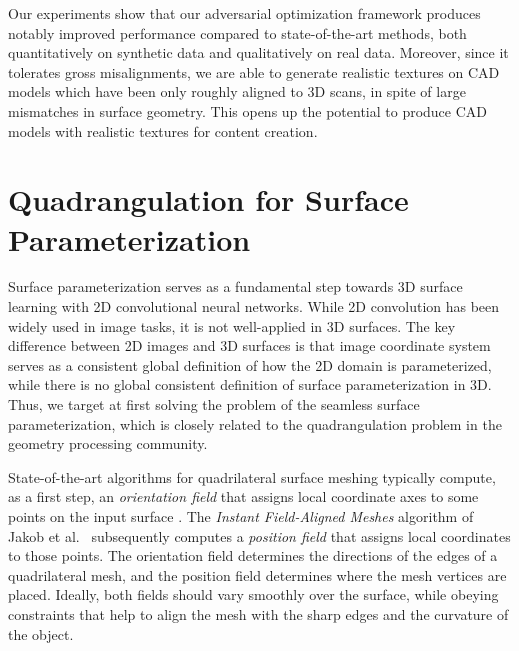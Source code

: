 Our experiments show that our adversarial optimization framework produces notably improved performance compared to state-of-the-art methods, both quantitatively on synthetic data and qualitatively on real data. 
Moreover, since it tolerates gross misalignments, we are able to generate realistic textures on CAD models which have been only roughly aligned to 3D scans, in spite of large mismatches in surface geometry. 
This opens up the potential to produce CAD models with realistic textures for content creation.

\section{Quadrangulation for Surface Parameterization}
\label{intro:param}
Surface parameterization serves as a fundamental step towards 3D surface learning with 2D convolutional neural networks. While 2D convolution has been widely used in image tasks, it is not well-applied in 3D surfaces. The key difference between 2D images and 3D surfaces is that image coordinate system serves as a consistent global definition of how the 2D domain is parameterized, while there is no global consistent definition of surface parameterization in 3D. Thus, we target at first solving the problem of the seamless surface parameterization, which is closely related to the quadrangulation problem in the geometry processing community.

State-of-the-art algorithms for quadrilateral surface meshing typically compute, as a first step, an \emph{orientation field} that assigns local coordinate axes to some points on the input surface \cite{knupp1995mesh,ray2006periodic,kalberer2007quadcover,bommes2009mixed}. The {\em Instant Field-Aligned Meshes} \mbox{algorithm} of Jakob et al.~\cite{jakob2015instant} subsequently computes a \emph{position field} that assigns local coordinates %
to those points. The orientation field determines the directions of the edges of a quadrilateral mesh, and the position field determines where the mesh vertices are placed. Ideally, both fields should vary smoothly over the surface, while obeying constraints that help to align the mesh with the sharp edges and the curvature of the object.

